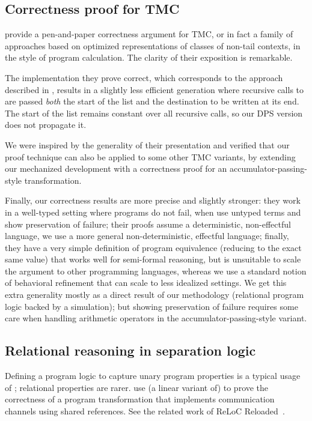 \subsection{Correctness proof for TMC}

\citet*{tmc-koka-2023} provide a pen-and-paper correctness argument for TMC, or in fact a family of approaches based on optimized representations of classes of non-tail contexts, in the style of program calculation.
The clarity of their exposition is remarkable.

The implementation they prove correct, which corresponds to the approach described in \citet*{minamide-98}, results in a slightly less efficient generation where recursive calls to  are passed \emph{both} the start of the list and the destination to be written at its end.
The start of the list remains constant over all recursive calls, so our DPS version does not propagate it.

We were inspired by the generality of their presentation and verified that our proof technique can also be applied to some other TMC variants, by extending our mechanized development with a correctness proof for an
accumulator-passing-style transformation.

Finally, our correctness results are more precise and slightly stronger: they work in a well-typed setting where programs do not fail, when use untyped terms and show preservation of failure; their proofs assume a deterministic, non-effectful language, we use a more general non-deterministic, effectful language; finally, they have a very simple definition of program equivalence (reducing to the exact same value) that works well for semi-formal reasoning, but is unsuitable to scale the argument to other programming languages, whereas we use a standard notion of behavioral refinement that can scale to less idealized settings.
%
We get this extra generality mostly as a direct result of our methodology (relational program logic backed by a simulation); but showing preservation of failure requires some care when handling arithmetic operators in the accumulator-passing-style variant.

\subsection{Relational reasoning in separation logic}

Defining a program logic to capture unary program properties is a typical usage of \Iris; relational properties are rarer. \citet*{tassarotti-2017} use (a linear variant of) \Iris to prove the correctness of a program transformation that implements communication channels using shared references. See the related work of ReLoC Reloaded~\citep*{reloc-2021}.


